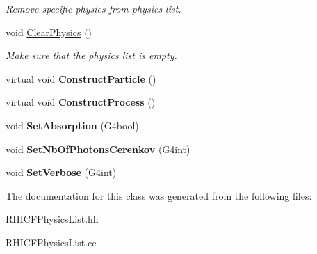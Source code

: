 \begin{DoxyCompactItemize}
\begin{DoxyCompactList}\small\item\em Remove specific physics from physics list. \end{DoxyCompactList}\item 
\hypertarget{class_r_h_i_c_f_physics_list_a77338f7345ed2c30ff30be204f4a37af}{}void \hyperlink{class_r_h_i_c_f_physics_list_a77338f7345ed2c30ff30be204f4a37af}{Clear\+Physics} ()\label{class_r_h_i_c_f_physics_list_a77338f7345ed2c30ff30be204f4a37af}

\begin{DoxyCompactList}\small\item\em Make sure that the physics list is empty. \end{DoxyCompactList}\item 
\hypertarget{class_r_h_i_c_f_physics_list_a5f70eec45caa590e719662ad76a98e8d}{}virtual void {\bfseries Construct\+Particle} ()\label{class_r_h_i_c_f_physics_list_a5f70eec45caa590e719662ad76a98e8d}

\item 
\hypertarget{class_r_h_i_c_f_physics_list_afc31964033ef0983b18bd2f34e13a6fb}{}virtual void {\bfseries Construct\+Process} ()\label{class_r_h_i_c_f_physics_list_afc31964033ef0983b18bd2f34e13a6fb}

\item 
\hypertarget{class_r_h_i_c_f_physics_list_a0960421ee6094d55494ca654af3beff4}{}void {\bfseries Set\+Absorption} (G4bool)\label{class_r_h_i_c_f_physics_list_a0960421ee6094d55494ca654af3beff4}

\item 
\hypertarget{class_r_h_i_c_f_physics_list_a25c8f0671b5c23a38d7a87a3fe018684}{}void {\bfseries Set\+Nb\+Of\+Photons\+Cerenkov} (G4int)\label{class_r_h_i_c_f_physics_list_a25c8f0671b5c23a38d7a87a3fe018684}

\item 
\hypertarget{class_r_h_i_c_f_physics_list_aed774051f4d69c451c9f332a55315f00}{}void {\bfseries Set\+Verbose} (G4int)\label{class_r_h_i_c_f_physics_list_aed774051f4d69c451c9f332a55315f00}

\end{DoxyCompactItemize}


The documentation for this class was generated from the following files\+:\begin{DoxyCompactItemize}
\item 
R\+H\+I\+C\+F\+Physics\+List.\+hh\item 
R\+H\+I\+C\+F\+Physics\+List.\+cc\end{DoxyCompactItemize}
